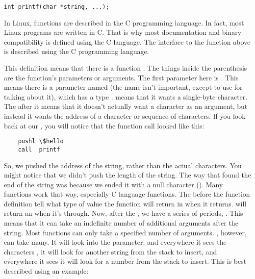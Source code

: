 \begin{simpletyping}
\begin{lstlisting}
int printf(char *string, ...);
\end{lstlisting}
\end{simpletyping}

In Linux, functions are described in the C programming language.
In fact, most Linux programs are written in C.  That is why most documentation
and binary compatibility is defined using the C language.  The interface to
the  function above is described using the C programming language.

This definition means that there is a function .
The things inside the parenthesis are the function's parameters or arguments.
The first parameter here is .  This means
there is a parameter named  (the name isn't
important, except to use for talking about it), which has a 
type .  
means that it wants a single-byte character.  The \icode{*\index{*}} after it means
that it doesn't actually want a character as an argument, but instead
it wants the address of a character or sequence of characters.  If you look
back at our , you will notice that
the function call looked like this:

\begin{simpletyping}
\begin{lstlisting}
	pushl \$hello
	call  printf
\end{lstlisting}
\end{simpletyping}

So, we pushed the address of the  string, rather
than the actual characters.  You might notice that we didn't push the length
of the string.  The way that  found
the end of the string was because we ended it with a null character
().  Many functions work that way, especially C language
functions.  The  before the function definition tell what
type of value the function will return in {\eaxRegIdx} when it returns.
 will return an 
when it's through.  Now, after the , we
have a series of periods, .  This means that it
can take an indefinite number of additional arguments after the string.  
Most functions can only take a specified number of arguments.  ,
however, can take many.  It will look into the 
 parameter, and everywhere it sees the characters
, it will look for another string from the stack to insert, and
everywhere it sees  it will look for a number
from the stack to insert.  This is best described using an example:

